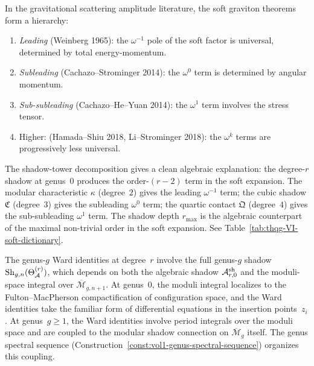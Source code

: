 \begin{remark}
\label{rem:thqg-VI-wcs-comparison}
In the gravitational scattering amplitude literature, the soft
graviton theorems form a hierarchy:
\begin{enumerate}[label=\textup{(\arabic*)}]
\item \emph{Leading} (Weinberg 1965): the $\omega^{-1}$ pole of
 the soft factor is universal, determined by total energy-momentum.
\item \emph{Subleading} (Cachazo--Strominger 2014): the $\omega^0$
 term is determined by angular momentum.
\item \emph{Sub-subleading} (Cachazo--He--Yuan 2014): the
 $\omega^1$ term involves the stress tensor.
\item Higher: (Hamada--Shiu 2018, Li--Strominger 2018): the
 $\omega^k$ terms are progressively less universal.
\end{enumerate}
The shadow-tower decomposition gives a clean algebraic explanation:
the degree-$r$ shadow at genus~$0$ produces the order-$(r-2)$
term in the soft expansion. The modular characteristic $\kappa$
(degree~$2$) gives the leading $\omega^{-1}$ term; the cubic shadow
$\mathfrak{C}$ (degree~$3$) gives the subleading $\omega^0$ term;
the quartic contact $\mathfrak{Q}$ (degree~$4$) gives the
sub-subleading $\omega^1$ term. The shadow depth $r_{\max}$
is the algebraic counterpart of the maximal non-trivial order in
the soft expansion. See Table~\ref{tab:thqg-VI-soft-dictionary}.
\end{remark}

\begin{remark}
\label{rem:thqg-VI-genus-dependence}
The genus-$g$ Ward identities at degree~$r$ involve the full
genus-$g$ shadow $\operatorname{Sh}_{g,n}(\Theta_{\mathcal{A}}^{(r)})$, which depends on
both the algebraic shadow $\mathcal{A}^{\mathrm{sh}}_{r,0}$ and the
moduli-space integral over $\overline{\mathcal{M}}_{g,n+1}$.
At genus~$0$, the moduli integral localizes to the
Fulton--MacPherson compactification of configuration space, and the
Ward identities take the familiar form of differential equations
in the insertion points~$z_i$.
At genus~$g \geq 1$, the Ward identities involve period integrals
over the moduli space and are coupled to the modular shadow
connection on $\overline{\mathcal{M}}_g$ itself. The genus
spectral sequence
(Construction~\ref{const:vol1-genus-spectral-sequence})
organizes this coupling.
\end{remark}

